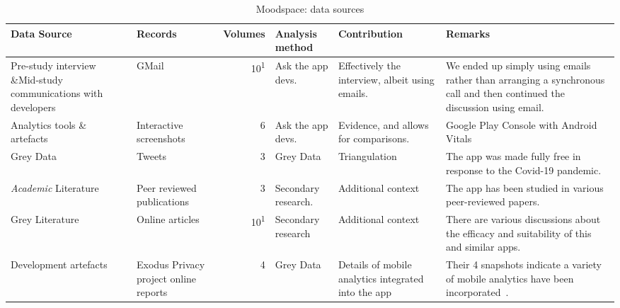 \begin{table*}
    \centering
    \footnotesize
    \tabcolsep=0.12cm
    \begin{tabular}{p{2.3cm}>{\raggedright}p{2.1cm}r>{\raggedright}p{2.4cm}>{\raggedright}p{2.8cm}>{\raggedright\arraybackslash}p{3.2cm}}
        Data Source & Records & Volumes & Analysis method & Contribution & Remarks \\
        \toprule
         Pre-study interview \&Mid-study communications with developers & GMail & 10\textsuperscript{1} & Ask the app devs. & Effectively the interview, albeit using emails.  & We ended up simply using emails rather than arranging a synchronous call and then continued the discussion using email.  \\
         Analytics tools \& artefacts &Interactive screenshots & 6 & Ask the app devs. & Evidence, and allows for comparisons. & Google Play Console with Android Vitals \\
         Grey Data &Tweets & 3 & Grey Data & Triangulation & The app was made fully free in response to the Covid-19 pandemic. \\
         \textit{Academic} Literature  &Peer reviewed publications & 3 & Secondary research. & Additional context & The app has been studied in various peer-reviewed papers.\footnotemark \\
         Grey Literature &Online articles & 10\textsuperscript{1} & Secondary research & Additional context & There are various discussions about the efficacy and suitability of this and similar apps. \\
         Development artefacts\footnotemark & Exodus Privacy project online reports & 4 & Grey Data & Details of mobile analytics integrated into the app & Their 4 snapshots indicate a variety of mobile analytics have been incorporated~\footnotemark. \\
         \bottomrule
    \end{tabular}
    \caption{Moodspace: data sources}
    \label{tab:moodspace-data-sources}
\end{table*}



